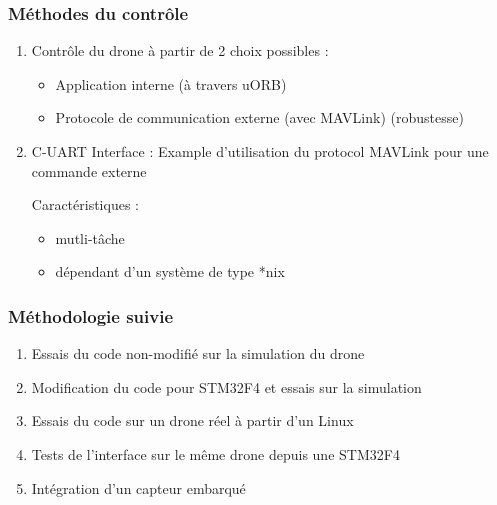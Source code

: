\documentclass{beamer}
\begin{document}
\begin{frame}
\frametitle{M\'ethodes du contr\^ole}

\begin{enumerate}

\item Contr\^ole du drone \`a partir de 2 choix possibles : 
			\begin{itemize}
				\item Application interne (\`a travers uORB) 
				\item Protocole de communication externe (avec MAVLink) (robustesse)
			\end{itemize}

\item C-UART Interface : Example d'utilisation du protocol MAVLink pour une commande externe
	  
	  Caract\'eristiques :
	  \begin{itemize}
		\item mutli-t\^ache
		\item d\'ependant d'un syst\`eme de type *nix
	   \end{itemize}

\end{enumerate}

\end{frame}


\begin{frame}
\frametitle{M\'ethodologie suivie}

\begin{enumerate}

\item Essais du code non-modifi\'e sur la simulation du drone 
\item Modification du code pour STM32F4 et essais sur la simulation
\item Essais du code sur un drone r\'eel \`a partir d'un Linux
\item Tests de l'interface sur le m\^eme drone depuis une STM32F4 
\item Int\'egration d'un capteur embarqu\'e 

\end{enumerate}

\end{frame}

\end{document}
